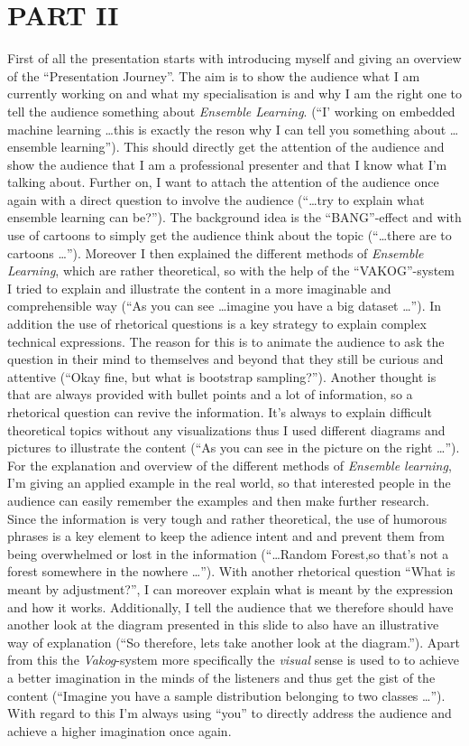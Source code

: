 \section{PART II}
First of all the presentation starts with introducing myself and giving an overview of the \enquote{Presentation Journey}\autocite[]{williams2008presentations}. The aim is to show the audience what I am currently working on and what my specialisation is and why I am the right one to tell the audience something about \textit{Ensemble Learning}. (\enquote{I' working on embedded machine learning \dots this is exactly the reson why I can tell you something about \dots ensemble learning}). This should directly get the attention of the audience and show the audience that I am a professional presenter and that I know what I'm talking about. Further on, I want to attach the attention of the audience once again with a direct question to involve the audience (\enquote{\dots try to explain what ensemble learning can be?}). The background idea is the \enquote{BANG}-effect \autocite[]{bomberb} and with use of cartoons to simply get the audience think about the topic (\enquote{\dots there are to cartoons \dots}). Moreover I then explained the different methods of \textit{Ensemble Learning}, which are rather theoretical, so with the help of the \enquote{VAKOG}-system \autocite{JumbuhPrabowo.2015} I tried to explain and illustrate the content in a more imaginable and comprehensible way (\enquote{As you can see \dots imagine you have a big dataset \dots}). In addition the use of rhetorical questions is a key strategy to explain complex technical expressions. The reason for this is to animate the audience to ask the question in their mind to themselves and beyond that they still be curious and attentive (\enquote{Okay fine, but what is bootstrap sampling?}). Another thought is that are always provided with bullet points and a lot of information, so a rhetorical question can revive the information. It's always to explain difficult theoretical topics without any visualizations thus I used different diagrams and pictures to illustrate the content (\enquote{As you can see in the picture on the right \dots}). For the explanation and overview of the different methods of \textit{Ensemble learning}, I'm giving an applied example in the real world, so that interested people in the audience can easily remember the examples and then make further research. Since the information is very tough and rather theoretical, the use of humorous phrases is a key element to keep the adience intent and and prevent them from being overwhelmed or lost in the information (\enquote{\dots Random Forest,so that's not a forest somewhere in the nowhere \dots}). With another rhetorical question \enquote{What is meant by adjustment?}, I can moreover explain what is meant by the expression and how it works. Additionally, I tell the audience that we therefore should have another look at the diagram presented in this slide to also have an illustrative way of explanation (\enquote{So therefore, lets take another look at the diagram.}). Apart from this the \textit{Vakog}-system more specifically the \textit{visual} sense is used to to achieve a better imagination in the minds of the listeners and thus get the gist of the content (\enquote{Imagine you have a sample distribution belonging to two classes \dots}). With regard to this I'm always using \enquote{you} to directly address the audience and achieve a higher imagination once again.